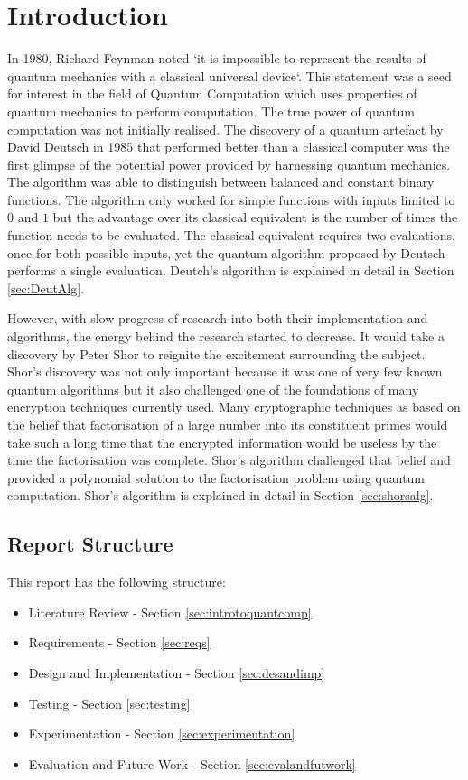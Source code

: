 \chapter{Introduction}
 \setcounter{page}{0} 

In 1980, Richard Feynman noted `it is impossible to represent the results of quantum mechanics with a classical universal device`\cite{Feynman82simulatingphysics}.
This statement was a seed for interest in the field of Quantum Computation which uses properties of quantum mechanics to perform computation.
The true power of quantum computation was not initially realised.
The discovery of a quantum artefact by David Deutsch\cite{Deutsch85quantumtheory} in 1985 that performed better than a classical computer was the first glimpse of the potential power provided by harnessing quantum mechanics.
The algorithm was able to distinguish between balanced and constant binary functions.
The algorithm only worked for simple functions with inputs limited to $0$ and $1$ but the advantage over its classical equivalent is the number of times the function needs to be evaluated.
The classical equivalent requires two evaluations, once for both possible inputs, yet the quantum algorithm proposed by Deutsch performs a single evaluation.
Deutch's algorithm is explained in detail in Section \ref{sec:DeutAlg}.

However, with slow progress of research into both their implementation and algorithms, the energy behind the research started to decrease.
It would take a discovery by Peter Shor\cite{Shor:1994jg} to reignite the excitement surrounding the subject.
Shor's discovery was not only important because it was one of very few known quantum algorithms but it also challenged one of the foundations of many encryption techniques currently used.
Many cryptographic techniques as based on the belief that factorisation of a large number into its constituent primes would take such a long time that the encrypted information would be useless by the time the factorisation was complete.
Shor's algorithm challenged that belief and provided a polynomial solution to the factorisation problem using quantum computation.
Shor's algorithm is explained in detail in Section \ref{sec:shorsalg}.

\section{Report Structure}
This report has the following structure:
\begin{itemize}
 \item Literature Review - Section \ref{sec:introtoquantcomp}
 \item Requirements - Section \ref{sec:reqs}
 \item Design and Implementation - Section \ref{sec:desandimp}
 \item Testing - Section \ref{sec:testing}
 \item Experimentation - Section \ref{sec:experimentation}
 \item Evaluation and Future Work - Section \ref{sec:evalandfutwork}
\end{itemize}





